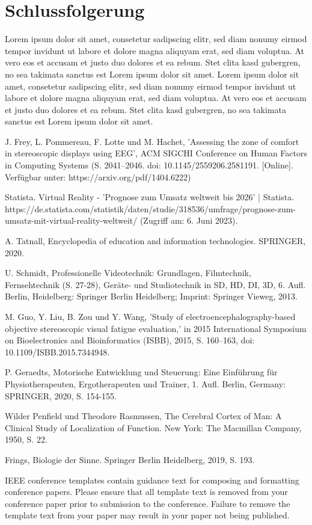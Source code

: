 \documentclass[conference]{IEEEtran}
\begin{document}
\section{Schlussfolgerung}
Lorem ipsum dolor sit amet, consetetur sadipscing elitr, sed diam nonumy eirmod tempor invidunt ut labore et dolore magna aliquyam erat, sed diam voluptua. At vero eos et accusam et justo duo dolores et ea rebum. Stet clita kasd gubergren, no sea takimata sanctus est Lorem ipsum dolor sit amet. Lorem ipsum dolor sit amet, consetetur sadipscing elitr, sed diam nonumy eirmod tempor invidunt ut labore et dolore magna aliquyam erat, sed diam voluptua. At vero eos et accusam et justo duo dolores et ea rebum. Stet clita kasd gubergren, no sea takimata sanctus est Lorem ipsum dolor sit amet.

\begin{thebibliography}{00}
 J. Frey, L. Pommereau, F. Lotte und M. Hachet, 'Assessing the zone of comfort in stereoscopic displays using EEG', ACM SIGCHI Conference on Human Factors in Computing Systems (S. 2041–2046. doi: 10.1145/2559206.2581191. [Online]. Verfügbar unter: https://arxiv.org/pdf/1404.6222)

 Statista. Virtual Reality - 'Prognose zum Umsatz weltweit bis 2026' | Statista. https://de.statista.com/statistik/daten/studie/318536/umfrage/prognose-zum-umsatz-mit-virtual-reality-weltweit/ (Zugriff am: 6. Juni 2023).

 A. Tatnall, Encyclopedia of education and information technologies. SPRINGER, 2020.

 U. Schmidt, Professionelle Videotechnik: Grundlagen, Filmtechnik, Fernsehtechnik (S. 27-28), Geräte- und Studiotechnik in SD, HD, DI, 3D, 6. Aufl. Berlin, Heidelberg: Springer Berlin Heidelberg; Imprint: Springer Vieweg, 2013.

 M. Guo, Y. Liu, B. Zou und Y. Wang, 'Study of electroencephalography-based objective stereoscopic visual fatigue evaluation,' in 2015 International Symposium on Bioelectronics and Bioinformatics (ISBB), 2015, S. 160–163, doi: 10.1109/ISBB.2015.7344948.

 P. Geraedts, Motorische Entwicklung und Steuerung: Eine Einführung für Physiotherapeuten, Ergotherapeuten und Trainer, 1. Aufl. Berlin, Germany: SPRINGER, 2020, S. 154-155.

 Wilder Penfield und Theodore Rasmussen, The Cerebral Cortex of Man: A Clinical Study of Localization of Function. New York: The Macmillan Company, 1950, S. 22.

 Frings, Biologie der Sinne. Springer Berlin Heidelberg, 2019, S. 193.

\end{thebibliography}
\vspace{12pt}
\color{red}
IEEE conference templates contain guidance text for composing and formatting conference papers. Please ensure that all template text is removed from your conference paper prior to submission to the conference. Failure to remove the template text from your paper may result in your paper not being published.
\end{document}
